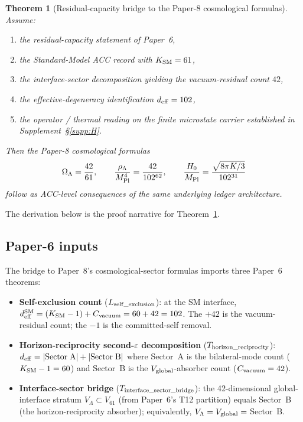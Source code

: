 \documentclass[11pt]{article}
\theoremstyle{plain}
\newtheorem{theorem}{Theorem}[section]
\theoremstyle{definition}
\theoremstyle{remark}
\newcommand{\Mpl}{M_{\rm Pl}}
\begin{document}
\begin{theorem}[Residual-capacity bridge to the Paper-8 cosmological formulas]\label{thm:bridge_cosmo}
Assume:
\begin{enumerate}[leftmargin=2.5em,label=\textup{(\roman*)}]
  \item the residual-capacity statement of Paper~6,
  \item the Standard-Model ACC record with $K_{\rm SM} = 61$,
  \item the interface-sector decomposition yielding the vacuum-residual count $42$,
  \item the effective-degeneracy identification $d_{\rm eff} = 102$,
  \item the operator / thermal reading on the finite microstate carrier established in Supplement~\S\ref{supp:H}.
\end{enumerate}
Then the Paper-8 cosmological formulas
\[
  \Omega_\Lambda = \frac{42}{61},\qquad
  \frac{\rho_\Lambda}{\Mpl^4} = \frac{42}{102^{62}},\qquad
  \frac{H_0}{\Mpl} = \frac{\sqrt{8\pi K/3}}{102^{31}}
\]
follow as ACC-level consequences of the same underlying ledger architecture.
\end{theorem}

\noindent The derivation below is the proof narrative for Theorem~\ref{thm:bridge_cosmo}.

\bigskip

\subsection{Paper-6 inputs}\label{supp:G1}

The bridge to Paper~8's cosmological-sector formulas imports three Paper~6 theorems:

\begin{itemize}[leftmargin=2em,itemsep=4pt]
  \item[\textbf{(P6.1)}]  \textbf{Self-exclusion count} ($L_{\rm self\_exclusion}$): at the SM interface, $d_{\rm eff}^{\rm SM} = (K_{\rm SM} - 1) + C_{\rm vacuum} = 60 + 42 = 102$.  The $+42$ is the vacuum-residual count; the $-1$ is the committed-self removal.
  \item[\textbf{(P6.2)}]  \textbf{Horizon-reciprocity second-$\varepsilon$ decomposition} ($T_{\rm horizon\_reciprocity}$): $d_{\rm eff} = |{\rm Sector\;A}| + |{\rm Sector\;B}|$ where Sector~A is the bilateral-mode count ($K_{\rm SM} - 1 = 60$) and Sector~B is the $V_{\rm global}$-absorber count ($C_{\rm vacuum} = 42$).
  \item[\textbf{(P6.3)}]  \textbf{Interface-sector bridge} ($T_{\rm interface\_sector\_bridge}$): the 42-dimensional global-interface stratum $V_\Lambda \subset V_{61}$ (from Paper~6's T12 partition) equals Sector~B (the horizon-reciprocity absorber); equivalently, $V_\Lambda = V_{\rm global} = $ Sector~B.
\end{itemize}
\end{document}
